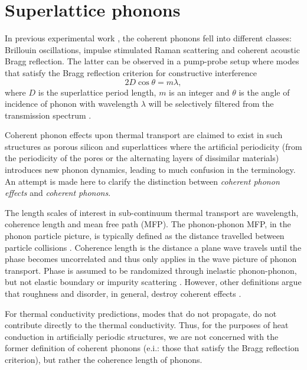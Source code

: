 \section{Superlattice phonons}

In previous experimental work \cite{PhysRevLett.73.740,PhysRevB.75.195309}, the coherent phonons fell into different classes: Brillouin oscillations, impulse stimulated Raman scattering and coherent acoustic Bragg reflection. The latter can be observed in a pump-probe setup where modes that satisfy the Bragg reflection criterion for constructive interference
\begin{equation}\label{EQ:Coh}
2D \cos \theta = m \lambda,
\end{equation}
where $D$ is the superlattice period length, $m$ is an integer and $\theta$ is the angle of incidence of phonon with wavelength $\lambda$ will be selectively filtered from the transmission spectrum \cite{PhysRevLett.43.2012}.

Coherent phonon effects upon thermal transport are claimed to exist in such structures as porous silicon \cite{doi:10.1021/nl102918q} and superlattices \cite{PhysRevB.67.195311} where the artificial periodicity (from the periodicity of the pores or the alternating layers of dissimilar materials) introduces new phonon dynamics, leading to much confusion in the terminology. An attempt is made here to clarify the distinction between \textit {coherent phonon effects} and \textit{coherent phonons}.

The length scales of interest in sub-continuum thermal transport are wavelength, coherence length and mean free path (MFP). The phonon-phonon MFP, in the phonon particle picture, is typically defined as the distance travelled between particle collisions \cite{ziman_electrons_2001}. Coherence length is the distance a plane wave travels until the phase becomes uncorrelated and thus only applies in the wave picture of phonon transport. Phase is assumed to be randomized through inelastic phonon-phonon, but not elastic boundary or impurity scattering \cite{chen2005nanoscale}. However, other definitions argue that roughness and disorder, in general, destroy coherent effects \cite{PhysRevB.67.195311,dames:682}.

For thermal conductivity predictions, modes that do not propagate, do not contribute directly to the thermal conductivity. Thus, for the purposes of heat conduction in artificially periodic structures, we are not concerned with the former definition of coherent phonons (e.i.: those that satisfy the Bragg reflection criterion), but rather the coherence length of phonons. 

